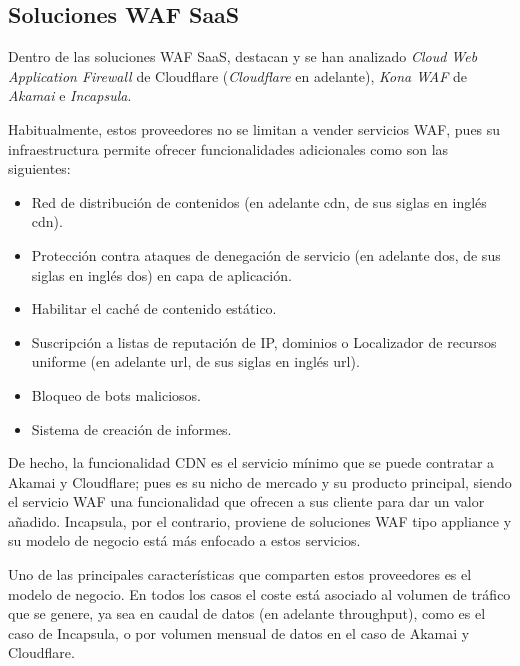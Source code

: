 \subsection{Soluciones WAF SaaS}
\par Dentro de las soluciones WAF SaaS, destacan y se han analizado {\em Cloud Web Application Firewall} \cite{cloudflarewaf} de Cloudflare\cite{cloudflare} ({\em Cloudflare} en adelante), {\em Kona WAF\cite{kona}} de {\em Akamai\cite{akamai}} e {\em Incapsula\cite{Incapsula}}.
\par Habitualmente, estos proveedores no se limitan a vender servicios WAF, pues su infraestructura permite ofrecer funcionalidades adicionales como son las siguientes:
\begin{itemize}
  \item Red de distribución de contenidos (en adelante \acrshort{cdn}, de sus siglas en inglés \acrlong{cdn}).
  \item Protección contra ataques de denegación de servicio (en adelante \acrshort{dos}, de sus siglas en inglés \acrlong{dos}) en capa de
    aplicación.
  \item Habilitar el caché de contenido estático.
  \item Suscripción a listas de reputación de IP, dominios o Localizador de recursos uniforme (en adelante \acrshort{url}, de sus siglas en inglés \acrlong{url}).
  \item Bloqueo de bots maliciosos.
  \item Sistema de creación de informes.
\end{itemize}
\par De hecho, la funcionalidad CDN es el servicio mínimo que se puede contratar a Akamai y Cloudflare; pues es su nicho de mercado y su producto
principal, siendo el servicio WAF una funcionalidad que ofrecen a sus cliente para dar un valor añadido. Incapsula, por el contrario, proviene
de soluciones WAF tipo appliance y su modelo de negocio está más enfocado a estos servicios.
\par Uno de las principales características que comparten estos proveedores es el modelo de negocio. En todos los casos el coste está asociado
al volumen de tráfico que se genere, ya sea en caudal de datos (en adelante \gls{throughput}), como es el caso de Incapsula, o por volumen mensual de datos en el caso de Akamai y Cloudflare.

